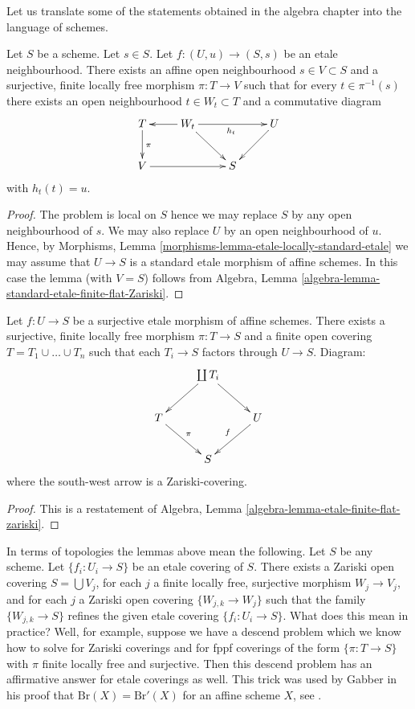 \noindent
Let us translate some of the statements obtained in the algebra chapter
into the language of schemes.

\begin{lemma}
\label{lemma-dominate-etale-neighbourhood-finite-flat}
Let $S$ be a scheme. Let $s \in S$.
Let $f : (U, u) \to (S, s)$ be an etale neighbourhood.
There exists an affine open neighbourhood $s \in V \subset S$
and a surjective, finite locally free morphism $\pi : T \to V$
such that for every $t \in \pi^{-1}(s)$ there exists an
open neighbourhood $t \in W_t \subset T$ and a commutative
diagram
$$
\xymatrix{
T \ar[d]^\pi & W_t \ar[l] \ar[rr]_{h_t} \ar[rd] & & U \ar[dl] \\
V \ar[rr] & & S
}
$$
with $h_t(t) = u$.
\end{lemma}

\begin{proof}
The problem is local on $S$ hence we may replace $S$ by any
open neighbourhood of $s$.
We may also replace $U$ by an open neighbourhood of $u$.
Hence, by Morphisms, Lemma \ref{morphisms-lemma-etale-locally-standard-etale}
we may assume that
$U \to S$ is a standard etale morphism of affine schemes.
In this case the lemma (with $V = S$) follows from
Algebra, Lemma \ref{algebra-lemma-standard-etale-finite-flat-Zariski}.
\end{proof}

\begin{lemma}
\label{lemma-dominate-etale-affine-finite-flat}
Let $f : U \to S$ be a surjective etale morphism of affine schemes.
There exists a surjective, finite locally free morphism
$\pi : T \to S$ and a finite open covering
$T = T_1 \cup \ldots \cup T_n$ such that each
$T_i \to S$ factors through $U \to S$. Diagram:
$$
\xymatrix{
& \coprod T_i  \ar[rd] \ar[ld] & \\
T \ar[rd]^\pi & & U \ar[ld]_f \\
& S &
}
$$
where the south-west arrow is a Zariski-covering.
\end{lemma}

\begin{proof}
This is a restatement of
Algebra, Lemma \ref{algebra-lemma-etale-finite-flat-zariski}.
\end{proof}

\begin{remark}
\label{remark-topologies}
In terms of topologies the lemmas above mean the following.
Let $S$ be any scheme. Let $\{f_i : U_i \to S\}$ be an etale covering
of $S$. There exists a Zariski open covering $S = \bigcup V_j$,
for each $j$ a finite locally free, surjective morphism
$W_j \to V_j$, and for each $j$ a Zariski open covering
$\{W_{j, k} \to W_j\}$ such that the family
$\{W_{j, k} \to S\}$ refines the given etale covering
$\{f_i : U_i \to S\}$. What does this mean in practice?
Well, for example, suppose we have a descend problem which we
know how to solve for Zariski coverings and for fppf coverings
of the form $\{\pi : T \to S\}$ with $\pi$ finite locally free
and surjective. Then this descend problem has an affirmative
answer for etale coverings as well. This trick was used by
Gabber in his proof that $\text{Br}(X) = \text{Br}'(X)$
for an affine scheme $X$, see \cite{Hoobler}.
\end{remark}

